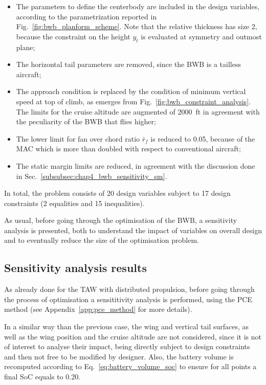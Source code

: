 \begin{itemize}
	\item The parameters to define the centerbody are included in the design variables, according to the parametrization reported in Fig.~\ref{fig:bwb_planform_scheme}. 
	Note that the relative thickness has size 2, because the constraint on the height $y_t$ is evaluated at symmetry and outmost plane;
	
	\item The horizontal tail parameters are removed, since the BWB is a tailless aircraft;
	
	\item The approach condition is replaced by the condition of minimum vertical speed at top of climb, as emerges from Fig.~\ref{fig:bwb_constraint_analysis}. 
	The limits for the cruise altitude are augmented of 2000~ft in agreement with the peculiarity of the BWB that flies higher;
	
	\item The lower limit for fan over chord ratio $\bar{r}_f$ is reduced to 0.05, because of the MAC which is more than doubled with respect to conventional aircraft;
	
	\item The static margin limits are reduced, in agreement with the discussion done in Sec.~\ref{subsubsec:chap4_bwb_sensitivity_sm}.
\end{itemize}

In total, the problem consists of 20 design variables subject to 17 design constraints (2 equalities and 15 inequalities). 

As usual, before going through the optimisation of the BWB, a sensitivity analysis is presented, both to understand the impact of variables on overall design and to eventually reduce the size of the optimisation problem.

\subsection{Sensitivity analysis results}
\label{subsec:chap4_bwb_sens_an}

As already done for the TAW with distributed propulsion, before going through the process of optimisation a sensititivity analysis is performed, using the PCE method (see Appendix~\ref{app:pce_method} for more details).

In a similar way than the previous case, the wing and vertical tail surfaces, as well as the wing position and the cruise altitude are not considered, since it is not of interest to analyse their impact, being directly subject to design constraints and then not free to be modified by designer. 
Also, the battery volume is recomputed according to Eq.~\eqref{eq:battery_volume_soc} to ensure for all points a final SoC equals to 0.20. 

